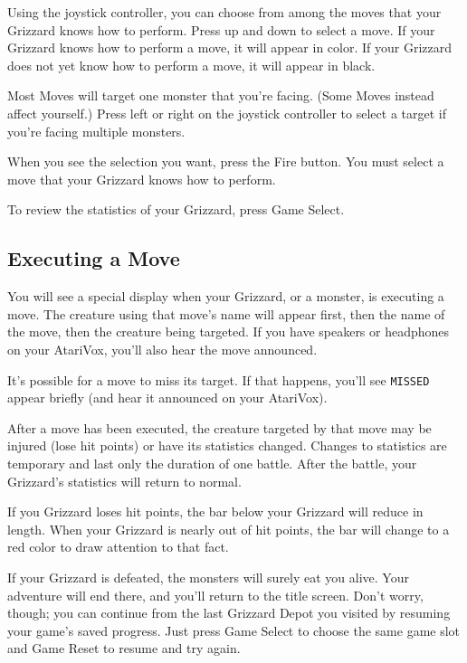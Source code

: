 \documentclass[12pt,openright,book]{memoir}
\begin{document}
Using the joystick controller, you can  choose from among the moves that
your Grizzard knows how to perform. Press  up and down to select a move.
If your Grizzard knows  how to perform a move, it  will appear in color.
If your Grizzard does not yet know how to perform a move, it will appear
in black.

Most  Moves will  target one  monster  that you're  facing. (Some  Moves
instead affect yourself.) Press left or right on the joystick controller
to select a target if you're facing multiple monsters.

When you  see the selection  you want, press  the Fire button.  You must
select a move that your Grizzard knows how to perform.

To review the statistics of your Grizzard, press Game Select.

\subsection{Executing a Move}

You will  see a  special display  when your Grizzard,  or a  monster, is
executing a move. The creature using that move's name will appear first,
then the name of the move, then the creature being targeted. If you have
speakers  or  headphones   on  your  AtariVox,  you'll   also  hear  the
move announced.

It's possible for a move to miss its target. If that happens, you'll see
\texttt{MISSED} appear briefly (and hear it announced on your AtariVox).

After a move  has been executed, the creature targeted  by that move may
be injured (lose hit points) or  have its statistics changed. Changes to
statistics  are temporary  and last  only  the duration  of one  battle.
After the battle, your Grizzard's statistics will return to normal.

If  you Grizzard  loses hit  points, the  bar below  your Grizzard  will
reduce in  length. When your Grizzard  is nearly out of  hit points, the
bar will change to a red color to draw attention to that fact.

If your  Grizzard is defeated, the  monsters will surely eat  you alive.
Your adventure  will end there, and  you'll return to the  title screen.
Don't worry, though;  you can continue from the last  Grizzard Depot you
visited by resuming  your game's saved progress. Just  press Game Select
to choose the same game slot and Game Reset to resume and try again.
\end{document}
